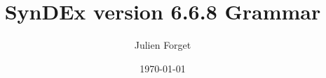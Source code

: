 \documentclass[10pt]{report}
\begin{document}
\title{SynDEx version 6.6.8 Grammar\\}
\author{Julien Forget}
\date{\today}
\maketitle
\tableofcontents





\end{document}
